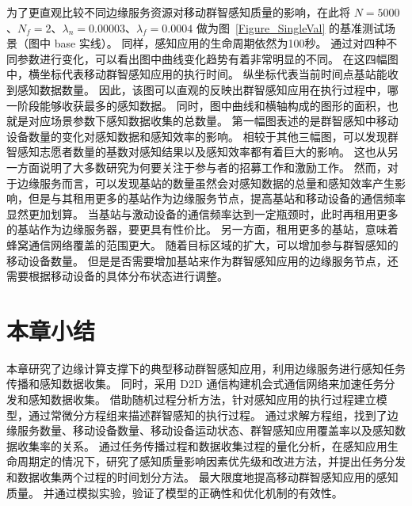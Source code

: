 为了更直观比较不同边缘服务资源对移动群智感知质量的影响，在此将 $N=5000$、$N_f=2$、$\lambda_n = 0.00003$、$\lambda_f=0.0004$ 做为图~\ref{Figure_SingleVal} 的基准测试场景（图中 base 实线）。
同样，感知应用的生命周期依然为100秒。
通过对四种不同参数进行变化，可以看出图中曲线变化趋势有着非常明显的不同。
在这四幅图中，横坐标代表移动群智感知应用的执行时间。
纵坐标代表当前时间点基站能收到感知数据数量。
因此，该图可以直观的反映出群智感知应用在执行过程中，哪一阶段能够收获最多的感知数据。
同时，图中曲线和横轴构成的图形的面积，也就是对应场景参数下感知数据收集的总数量。
第一幅图表述的是群智感知中移动设备数量的变化对感知数据和感知效率的影响。
相较于其他三幅图，可以发现群智感知志愿者数量的基数对感知结果以及感知效率都有着巨大的影响。
这也从另一方面说明了大多数研究为何要关注于参与者的招募工作和激励工作。
然而，对于边缘服务而言，可以发现基站的数量虽然会对感知数据的总量和感知效率产生影响，但是与其租用更多的基站作为边缘服务节点，提高基站和移动设备的通信频率显然更加划算。
当基站与激动设备的通信频率达到一定瓶颈时，此时再租用更多的基站作为边缘服务器，要更具有性价比。
另一方面，租用更多的基站，意味着蜂窝通信网络覆盖的范围更大。
随着目标区域的扩大，可以增加参与群智感知的移动设备数量。
但是是否需要增加基站来作为群智感知应用的边缘服务节点，还需要根据移动设备的具体分布状态进行调整。

\section{本章小结}

本章研究了边缘计算支撑下的典型移动群智感知应用，利用边缘服务进行感知任务传播和感知数据收集。
同时，采用 D2D 通信构建机会式通信网络来加速任务分发和感知数据收集。
借助随机过程分析方法，针对感知应用的执行过程建立模型，通过常微分方程组来描述群智感知的执行过程。
通过求解方程组，找到了边缘服务数量、移动设备数量、移动设备运动状态、群智感知应用覆盖率以及感知数据收集率的关系。
通过任务传播过程和数据收集过程的量化分析，在感知应用生命周期定的情况下，研究了感知质量影响因素优先级和改进方法，并提出任务分发和数据收集两个过程的时间划分方法。
最大限度地提高移动群智感知应用的感知质量。
并通过模拟实验，验证了模型的正确性和优化机制的有效性。
